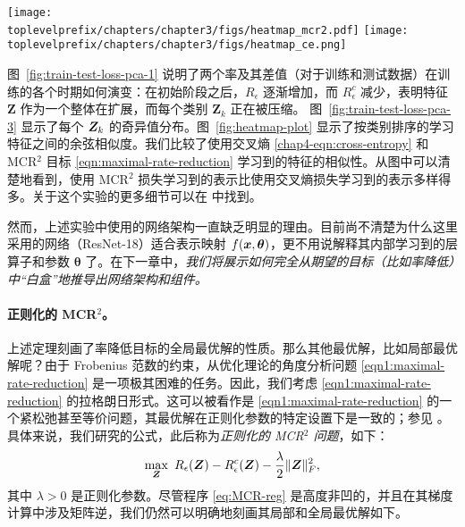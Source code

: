 \documentclass[../../book-main_zh.tex]{subfiles}
\begin{document}
\begin{example}
	\begin{figure*}[b]
		\begin{center}

			\texttt{[image: \\toplevelprefix/chapters/chapter3/figs/heatmap\_mcr2.pdf]}
			\hspace{0.25cm}
			\texttt{[image: \\toplevelprefix/chapters/chapter3/figs/heatmap\_ce.png]}
			\caption{\small 使用 MCR$^2$ 目标（\textbf{左}）和 CE 损失（\textbf{右}）学习到的特征之间的余弦相似度。}
			\label{fig:heatmap-plot}
		\end{center}
		\vskip -0.1in
	\end{figure*}

	图~\ref{fig:train-test-loss-pca-1} 说明了两个率及其差值（对于训练和测试数据）在训练的各个时期如何演变：在初始阶段之后，$R_\epsilon$ 逐渐增加，而 $R^c_\epsilon$ 减少，表明特征 $\bm Z$ 作为一个整体在扩展，而每个类别 $\bm Z_k$ 正在被压缩。
	图~\ref{fig:train-test-loss-pca-3} 显示了每个 $\bm{Z}_k$ 的奇异值分布。图~\ref{fig:heatmap-plot} 显示了按类别排序的学习特征之间的余弦相似度。我们比较了使用交叉熵 \eqref{chap4-eqn:cross-entropy} 和 MCR$^2$ 目标 \eqref{eqn:maximal-rate-reduction} 学习到的特征的相似性。从图中可以清楚地看到，使用 MCR$^2$ 损失学习到的表示比使用交叉熵损失学习到的表示多样得多。关于这个实验的更多细节可以在 \cite{chan2021redunet} 中找到。
	\label{eg:Rate-Reduction-CIFAR10}
\end{example}


然而，上述实验中使用的网络架构一直缺乏明显的理由。目前尚不清楚为什么这里采用的网络（ResNet-18）适合表示映射 $f(\bm{x}, \bm \theta)$，更不用说解释其内部学习到的层算子和参数 $\bm \theta$ 了。在下一章中，{\em 我们将展示如何完全从期望的目标（比如率降低）中“白盒”地推导出网络架构和组件。}



\paragraph{正则化的 MCR$^2$。}
上述定理刻画了率降低目标的全局最优解的性质。那么其他最优解，比如局部最优解呢？由于 Frobenius 范数的约束，从优化理论的角度分析问题 \eqref{eqn1:maximal-rate-reduction} 是一项极其困难的任务。因此，我们考虑 \eqref{eqn1:maximal-rate-reduction} 的拉格朗日形式。这可以被看作是 \eqref{eqn1:maximal-rate-reduction} 的一个紧松弛甚至等价问题，其最优解在正则化参数的特定设置下是一致的；参见 \cite[Proposition 1]{wang2024global}。
具体来说，我们研究的公式，此后称为\textit{正则化的 MCR$^2$ 问题}，如下：
\begin{align}\label{eq:MCR-reg}
	\max_{\bm Z}\ R_{\epsilon}(\bm{Z}) - R_{\epsilon}^c(\bm{Z}) - \frac{\lambda}{2}\|\bm Z\|_F^2,
\end{align}
其中 $\lambda > 0$ 是正则化参数。尽管程序 \eqref{eq:MCR-reg} 是高度非凹的，并且在其梯度计算中涉及矩阵逆，我们仍然可以明确地刻画其局部和全局最优解如下。
\end{document}
